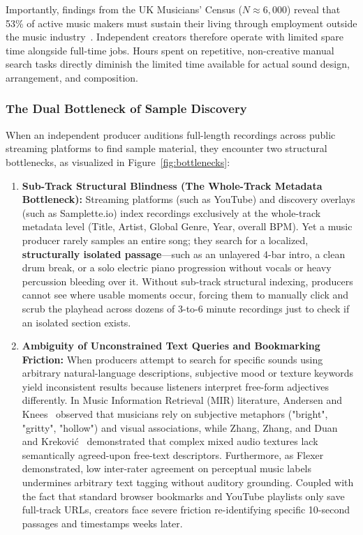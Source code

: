 Importantly, findings from the UK Musicians' Census ($N \approx 6,000$) reveal that 53\% of active music makers must sustain their living through employment outside the music industry~\cite{ref:ukcensus2023, ref:cmu2023}. Independent creators therefore operate with limited spare time alongside full-time jobs. Hours spent on repetitive, non-creative manual search tasks directly diminish the limited time available for actual sound design, arrangement, and composition.

\subsubsection*{The Dual Bottleneck of Sample Discovery}
When an independent producer auditions full-length recordings across public streaming platforms to find sample material, they encounter two structural bottlenecks, as visualized in Figure~\ref{fig:bottlenecks}:

\begin{enumerate}
    \item \textbf{Sub-Track Structural Blindness (The Whole-Track Metadata Bottleneck):} 
    Streaming platforms (such as YouTube) and discovery overlays (such as Samplette.io) index recordings exclusively at the whole-track metadata level (Title, Artist, Global Genre, Year, overall BPM). Yet a music producer rarely samples an entire song; they search for a localized, \textbf{structurally isolated passage}---such as an unlayered 4-bar intro, a clean drum break, or a solo electric piano progression without vocals or heavy percussion bleeding over it. Without sub-track structural indexing, producers cannot see where usable moments occur, forcing them to manually click and scrub the playhead across dozens of 3-to-6 minute recordings just to check if an isolated section exists.

    \item \textbf{Ambiguity of Unconstrained Text Queries and Bookmarking Friction:} 
    When producers attempt to search for specific sounds using arbitrary natural-language descriptions, subjective mood or texture keywords yield inconsistent results because listeners interpret free-form adjectives differently. In Music Information Retrieval (MIR) literature, Andersen and Knees~\cite{ref:andersen2016} observed that musicians rely on subjective metaphors ("bright", "gritty", "hollow") and visual associations, while Zhang, Zhang, and Duan~\cite{ref:zhang2019} and Krekovi\'{c}~\cite{ref:krekovic2019} demonstrated that complex mixed audio textures lack semantically agreed-upon free-text descriptors. Furthermore, as Flexer~\cite{ref:flexer2014} demonstrated, low inter-rater agreement on perceptual music labels undermines arbitrary text tagging without auditory grounding. Coupled with the fact that standard browser bookmarks and YouTube playlists only save full-track URLs, creators face severe friction re-identifying specific 10-second passages and timestamps weeks later.
\end{enumerate}

